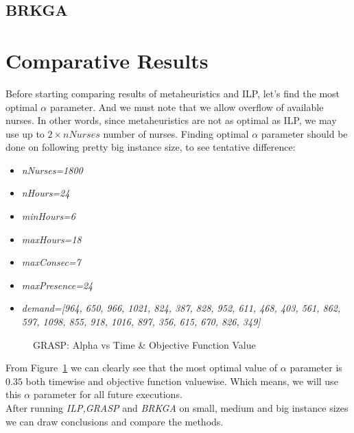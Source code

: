 \documentclass{article}
\newcommand\tab[1][1cm]{\hspace*{#1}}
\begin{document}
	\subsection{BRKGA}
	\section{Comparative Results}
\tab Before starting comparing results of metaheuristics and ILP, let's find the most optimal $\alpha$ parameter. And we must note that we allow overflow of available nurses. In other words, since metaheuristics are not as optimal as ILP, we may use up to $2 \times nNurses$ number of nurses. Finding optimal $\alpha$ parameter should be done on following pretty big instance size, to see tentative difference:
\begin{itemize}
	\item \small \textit{nNurses=1800}
	\item \small \textit{nHours=24}
	\item \small \textit{minHours=6}
	\item \small \textit{maxHours=18}
	\item \small \textit{maxConsec=7}
	\item \small \textit{maxPresence=24}
	\item \small \textit{demand=[964, 650, 966, 1021, 824, 387, 828, 952, 611, 468, 403, 561, 862, 597, 1098, 855, 918, 1016, 897, 356, 615, 670, 826, 349]}
\end{itemize}

\begin{figure}[!htbp]
	\caption{GRASP: Alpha vs Time \& Objective Function Value}
	\label{fig:graspalpha}
\end{figure}
\tab From Figure~\ref{fig:graspalpha} we can clearly see that the most optimal value of $\alpha$ parameter is $0.35$ both timewise and objective function valuewise. Which means, we will use this $\alpha$ parameter for all future executions.\\
\tab After running \textit{ILP,GRASP} and \textit{BRKGA} on small, medium and big instance sizes we can draw conclusions and compare the methods.
\end{document}
